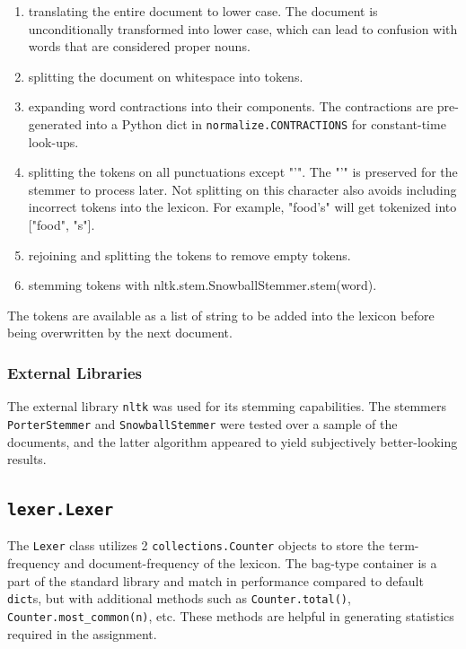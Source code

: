 \documentclass[11pt]{article}
\begin{document}
\begin{enumerate}
    \item translating the entire document to lower case. The document is unconditionally transformed into lower case, which can lead to confusion with words that are considered proper nouns.

    \item splitting the document on whitespace into tokens.

    \item expanding word contractions into their components. The contractions are pre-generated into a Python dict in \texttt{normalize.CONTRACTIONS} for constant-time look-ups.

    \item splitting the tokens on all punctuations except "'". The "'" is preserved for the stemmer to process later. Not splitting on this character also avoids including incorrect tokens into the lexicon. For example, "food's" will get tokenized into ["food", "s"].

    \item rejoining and splitting the tokens to remove empty tokens.

    \item stemming tokens with nltk.stem.SnowballStemmer.stem(word).
\end{enumerate}

The tokens are available as a list of string to be added into the lexicon before being overwritten by the next document.

\subsubsection{External Libraries}
The external library \texttt{nltk} was used for its stemming capabilities. The stemmers \texttt{PorterStemmer} and \texttt{SnowballStemmer} were tested over a sample of the documents, and the latter algorithm appeared to yield subjectively better-looking results.

\subsection{\texttt{lexer.Lexer}}
The \texttt{Lexer} class utilizes 2 \texttt{collections.Counter} objects to store the term-frequency and document-frequency of the lexicon. The bag-type container is a part of the standard library and match in performance compared to default \texttt{dict}s, but with additional methods such as \texttt{Counter.total()}, \texttt{Counter.most\_common(n)}, etc. These methods are helpful in generating statistics required in the assignment.
\end{document}
